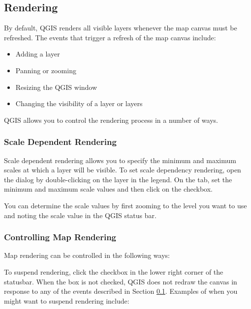 \subsection{Rendering}\label{subsec:redraw_events}

By default, QGIS renders all visible layers whenever the map canvas must be
refreshed. The events that trigger a refresh of the map canvas include:

\begin{itemize}
\item Adding a layer
\item Panning or zooming
\item Resizing the QGIS window
\item Changing the visibility of a layer or layers
\end{itemize}

QGIS allows you to control the rendering process in a number of ways.

\subsubsection{Scale Dependent Rendering}
\label{label_scaledepend}

Scale dependent rendering allows you to specify the minimum and maximum
scales at which a layer will be visible.  To set scale dependency rendering,
open the  dialog by double-clicking on the layer in the legend. On
the  tab, set the minimum and maximum scale values and then
click on the  checkbox.

You can determine the scale values by first zooming to the level you want
to use and noting the scale value in the QGIS status bar.

\subsubsection{Controlling Map Rendering}\label{label_controlmap}

Map rendering can be controlled in the following ways:

\label{label_suspendrender}

To suspend rendering, click the  checkbox in the lower right
corner of the statusbar. When the  box is not checked, QGIS
does not redraw the canvas in response to any of the events described in
Section \ref{subsec:redraw_events}. Examples of when you might want to suspend
rendering include:


